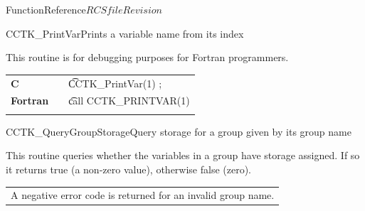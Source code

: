\begin{cactuspart}{FunctionReference}{$RCSfile$}{$Revision$}
\begin{CCTKFunc}{CCTK\_PrintVar}{Prints a variable name from its index}
\label{CCTK-PrintVar}
\subroutine{}{}{}
\showargs
\begin{params}
\end{params}
\begin{discussion}
This routine is for debugging purposes for Fortran programmers.
\end{discussion}
\begin{examples}
\begin{tabular}{@{}p{3cm}cp{11cm}}
\hfill {\bf C} && {\t CCTK\_PrintVar(1) ;}
\\
\hfill {\bf Fortran} && {\t call CCTK\_PRINTVAR(1)}\\
\\
\end{tabular}
\end{examples}
\begin{errorcodes}
\end{errorcodes}
\end{CCTKFunc}







\begin{CCTKFunc}{CCTK\_QueryGroupStorage}{Query storage for a group given by its group name}
\label{CCTK-QueryGroupStorage}
\showargs
\begin{params}
\end{params}
\begin{discussion}
This routine queries whether the variables in a group have storage assigned.
If so it returns true (a non-zero value), otherwise false (zero).
\end{discussion}
\begin{errorcodes}
\begin{tabular}{l}
A negative error code is returned for an invalid group name.
\end{tabular}
\end{errorcodes}
\end{CCTKFunc}



\end{cactuspart}
